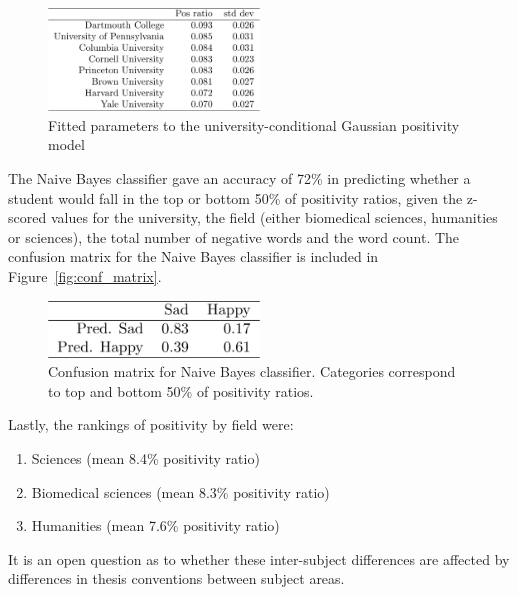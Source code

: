\begin{figure}[hH]
  \centering
  \includegraphics[width=0.5\textwidth]{img/gaussian_model.pdf}
  \caption{Fitted parameters to the university-conditional Gaussian positivity model}
  \label{fig:gaussian_model}
\end{figure}

The Naive Bayes classifier gave an accuracy of 72\% in predicting whether a student would fall in the top or bottom 50\% of positivity ratios, given the z-scored values for the university, the field (either biomedical sciences, humanities or sciences), the total number of negative words and the word count. The confusion matrix for the Naive Bayes classifier is included in Figure~\ref{fig:conf_matrix}.

\begin{figure}[hH]
  \centering
  \includegraphics[width=0.5\textwidth]{img/conf_matrix.pdf}
  \caption{Confusion matrix for Naive Bayes classifier. Categories correspond to top and bottom 50\% of positivity ratios.}
  \label{fig:gaussian_model}
\end{figure}

Lastly, the rankings of positivity by field were:
\begin{enumerate}
  \item Sciences (mean 8.4\% positivity ratio)
  \item Biomedical sciences (mean 8.3\% positivity ratio)
  \item Humanities (mean 7.6\% positivity ratio)
\end{enumerate}
It is an open question as to whether these inter-subject differences are affected by differences in thesis conventions between subject areas.